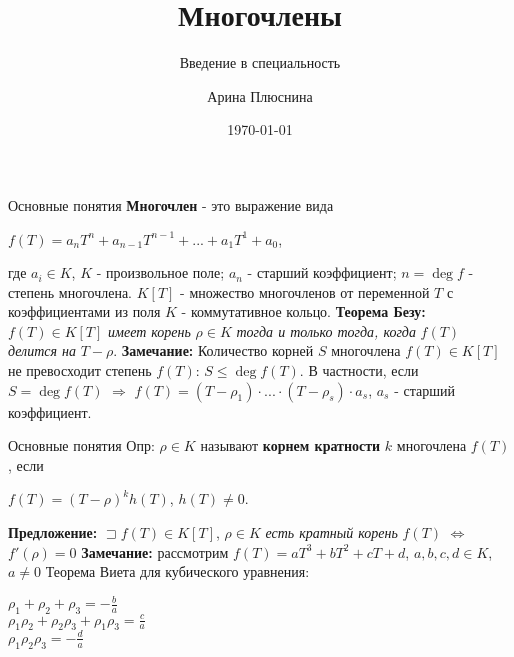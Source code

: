 \documentclass{beamer}
\title{Многочлены}
\subtitle{Введение в специальность}
\author{Арина Плюснина}
\institute{БФУ им. И. Канта}
\date{\today}
\begin{document}
\begin{frame}
	\titlepage
\end{frame}
\begin{frame}{Основные понятия}
	\textbf{Многочлен} - это выражение вида \begin{center}$f(T)=a_{n} T^n+a_{n-1}T^{n-1}+...+a_1T^1+a_0$,
	\end{center}
	где $a_i\in K$, $K$ - произвольное поле;
	$a_n$ -  старший коэффициент;
	$n=\deg f$ - степень многочлена.
	\newline $K[T]$ - множество многочленов от переменной $T$ с коэффициентами из поля $K$ - коммутативное кольцо.
	\newline \textbf{Теорема Безу:} $f(T)\in K[T]$ \textit{имеет корень} $\rho\in K$ \textit{тогда и только тогда, когда} $f(T)$ \textit{делится на} $T-\rho$.
	\newline \textbf{Замечание:} Количество корней $S$ многочлена $f(T)\in K[T]$ не превосходит степень $f(T)$: $S\le\deg f(T)$. В частности, если $S=\deg f(T)$ $\Rightarrow$ $f(T)=(T-\rho_1)\cdot...\cdot(T-\rho_s)\cdot a_s$, $a_s$ - старший коэффициент. 
\end{frame}

\begin{frame}{Основные понятия}
	Опр: $\rho\in K$ называют \textbf{корнем кратности} $k$ многочлена $f(T)$, если 
	\begin{center}
		$f(T)=(T-\rho)^kh(T)$, $h(T)\ne0$.
	\end{center}
	\textbf{Предложение:} $\sqsupset f(T)\in K[T]$, $\rho\in K$ \textit{есть кратный корень} $f(T)$ $\Leftrightarrow$ $f'(\rho)=0$
	\newline \textbf{Замечание:} рассмотрим $f(T)=aT^3+bT^2+cT+d$, $a,b,c,d\in K$, $a\ne0$
	\newline Теорема Виета для кубического уравнения:
	\begin{center}
		$\rho_1+\rho_2+\rho_3=-\frac{b}{a}$ \\$\rho_1\rho_2+\rho_2\rho_3+\rho_1\rho_3=\frac{c}{a}$ \\$\rho_1\rho_2\rho_3=-\frac{d}{a}$  
	\end{center}
	\end{frame}
\end{document}
